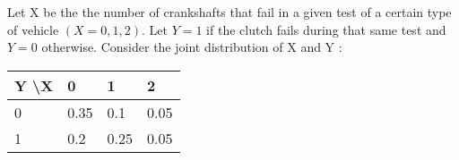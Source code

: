 \documentclass[addpoints]{examsetup}
\begin{document}
\begin{questions}

\question
Let X be the the number of crankshafts that fail in a given test of a certain type of vehicle $(X = 0, 1, 2)$. Let $Y = 1$ if the clutch fails during that same test and $Y = 0$ otherwise. Consider the joint distribution of X and Y :

 \begin{table}[h!]
     \centering
     \begin{tabular}{llll}
        \hline
         Y \textbackslash  X  &  0    &  1   & 2 \\\hline \hline
         0      &  0.35 &  0.1 & 0.05   \\
         1      &  0.2  & 0.25 & 0.05   \\ \hline\hline

     \end{tabular}
  \end{table}
\end{questions}
\end{document}
